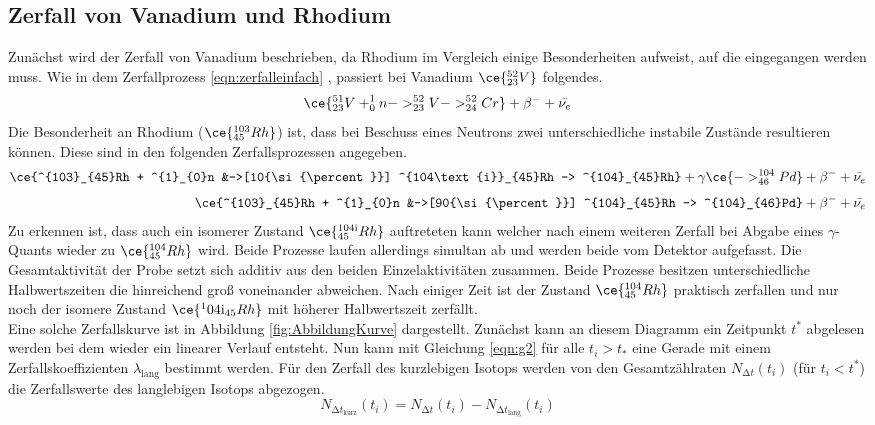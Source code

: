 \subsection{Zerfall von Vanadium und Rhodium}
\label{sec:zerfallxd}
Zunächst wird der Zerfall von Vanadium beschrieben, da Rhodium im Vergleich einige Besonderheiten aufweist, auf die eingegangen werden muss.
Wie in dem Zerfallprozess \eqref{eqn:zerfalleinfach} , passiert bei Vanadium $\ce{^{52}_{23}V}$ folgendes.
\begin{equation}
\ce{^{51}_{23}V + ^{1}_{0}n -> ^{52}_{23}V -> ^{52}_{24}Cr} + {\beta}^{-} + \bar{\nu_{e}} 
\end{equation}
Die Besonderheit an Rhodium ($\ce{^{103}_{45}Rh}$) ist, dass bei Beschuss eines Neutrons zwei unterschiedliche instabile Zustände resultieren können. 
Diese sind in den folgenden Zerfallsprozessen angegeben.
\begin{align}
\ce{^{103}_{45}Rh + ^{1}_{0}n &->[10{\si{\percent}}] ^{104\text{i}}_{45}Rh -> ^{104}_{45}Rh} + \gamma \ce{-> ^{104}_{46}Pd} + {\beta}^{-} + \bar{\nu_{e}} \\[3pt]
\ce{^{103}_{45}Rh + ^{1}_{0}n &->[90{\si{\percent}}] ^{104}_{45}Rh -> ^{104}_{46}Pd} + {\beta}^{-} + \bar{\nu_{e}} 
\end{align}
Zu erkennen ist, dass auch ein isomerer Zustand $\ce{^{104{\text{i}}}_{45}Rh}$ auftreteten kann welcher nach einem weiteren Zerfall bei Abgabe eines $\gamma$-Quants wieder zu $\ce{^{104}_{45}Rh}$ wird.
Beide Prozesse laufen allerdings simultan ab und werden beide vom Detektor aufgefasst. 
Die Gesamtaktivität der Probe setzt sich additiv aus den beiden Einzelaktivitäten zusammen. Beide Prozesse besitzen unterschiedliche Halbwertszeiten die hinreichend
groß voneinander abweichen. Nach einiger Zeit ist der Zustand $\ce{^{104}_{45}Rh}$ praktisch zerfallen und nur noch der isomere Zustand $\ce{^104{\text{i}}_{45}Rh}$ mit höherer Halbwertszeit zerfällt.
\\
\newline
Eine solche Zerfallskurve ist in Abbildung \ref{fig:AbbildungKurve} dargestellt.
Zunächst kann an diesem Diagramm ein Zeitpunkt $t^{*}$ abgelesen werden bei dem wieder ein linearer Verlauf entsteht. Nun kann mit Gleichung 
\eqref{eqn:g2} für alle $t_{i} > t_{*}$ eine Gerade mit einem Zerfallskoeffizienten $\lambda_{\text{lang}}$ bestimmt werden.
Für den Zerfall des kurzlebigen Isotops werden von den Gesamtzählraten $N_{\increment t}(t_{i})$ (für $t_{i} < t^{*}$) die Zerfallswerte des langlebigen Isotops abgezogen.
\begin{equation}
\label{eqn:kurz}
N_{{\increment t}_{\text{kurz}}}(t_{i}) = N_{\increment t}(t_{i}) - N_{{\increment t}_{\text{lang}}}(t_{i})
\end{equation}
